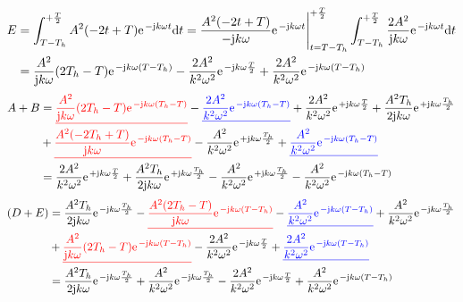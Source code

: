 \documentclass[11pt,a4paper,DIV=12]{scrartcl}
\newcommand{\ured}[1]{\textcolor{red}{\underline{#1}}}
\newcommand{\ublue}[1]{\textcolor{blue}{\underline{#1}}}
\newcommand{\diff}{\mathrm{d}}
\begin{document}
\begin{align}
	E&=\int_{T-T_h}^{+\frac{T}{2}}A^2(-2t+T)\e^{-\im k \omega t}\diff t=\frac{A^2(-2t+T)}{-\im k \omega}\e^{-\im k \omega t}\Bigg |_{t=T-T_h}^{+\frac{T}{2}}\int_{T-T_h}^{+\frac{T}{2}}\frac{2A^2}{\im k \omega}\e^{-\im k \omega t}\diff t\nonumber \\
	&=\frac{A^2}{\im k \omega}(2T_h-T)\e^{-\im k \omega (T-T_h)}-\frac{2A^2}{k^2\omega^2}\e^{-\im k \omega \frac{T}{2}}+\frac{2A^2}{k^2\omega^2}\e^{-\im k \omega (T-T_h)}
\end{align}
\begin{align}
	A+B&=\ured{\frac{A^2}{\im k \omega}(2T_h-T)\e^{-\im k \omega (T_h-T)}}-\ublue{\frac{2A^2}{k^2\omega^2}\e^{-\im k \omega (T_h-T)}}+\frac{2A^2}{k^2\omega^2}\e^{+\im k \omega \frac{T}{2}}+\frac{A^2T_h}{2\im k \omega}\e^{+\im k \omega \frac{T_h}{2}}\nonumber \\
	&+\ured{\frac{A^2(-2T_h+T)}{\im k \omega}\e^{-\im k \omega (T_h-T)}}-\frac{A^2}{k^2\omega^2}\e^{+\im k \omega \frac{T_h}{2}}+\ublue{\frac{A^2}{k^2\omega^2}\e^{-\im k \omega (T_h-T)}}\nonumber \\
	&=\frac{2A^2}{k^2\omega^2}\e^{+\im k \omega \frac{T}{2}}+\frac{A^2T_h}{2\im k \omega}\e^{+\im k \omega \frac{T_h}{2}}-\frac{A^2}{k^2\omega^2}\e^{+\im k \omega\frac{T_h}{2}}-\frac{A^2}{k^2\omega^2}\e^{-\im k \omega (T_h-T)}
\end{align}
\begin{align}
	(D+E)&=\frac{A^2T_h}{2\im k \omega}\e^{-\im k \omega \frac{T_h}{2}}-\ured{\frac{A^2(2T_h-T)}{\im k \omega}\e^{-\im k \omega (T-T_h)}}-\ublue{\frac{A^2}{k^2\omega^2}\e^{-\im k \omega (T-T_h)}}+\frac{A^2}{ k^2 \omega^2}\e^{-\im k \omega \frac{T_h}{2}}\nonumber \\
	&+\ured{\frac{A^2}{\im k \omega}(2T_h-T)\e^{-\im k \omega (T-T_h)}}-\frac{2A^2}{k^2\omega^2}\e^{-\im k \omega \frac{T}{2}}+\ublue{\frac{2A^2}{k^2\omega^2}\e^{-\im k \omega (T-T_h)}}\nonumber\\
	&=\frac{A^2T_h}{2\im k \omega}\e^{-\im k \omega \frac{T_h}{2}}+\frac{A^2}{ k^2 \omega^2}\e^{-\im k \omega \frac{T_h}{2}}-\frac{2A^2}{k^2\omega^2}\e^{-\im k \omega \frac{T}{2}}+\frac{A^2}{k^2\omega^2}\e^{-\im k \omega (T-T_h)}
\end{align}
\end{document}

